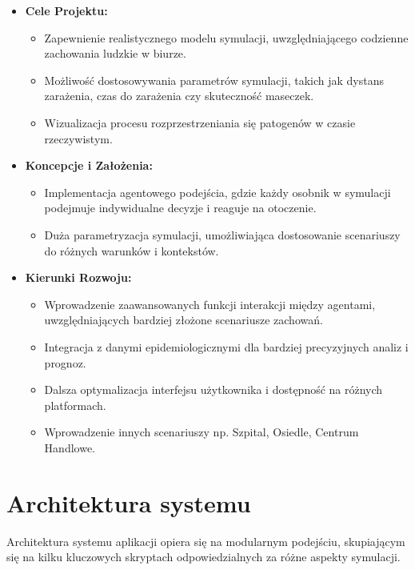 \begin{itemize}
	\item \textbf{Cele Projektu:}
	\begin{itemize}
		\item Zapewnienie realistycznego modelu symulacji, uwzględniającego codzienne zachowania ludzkie w biurze.
		\item Możliwość dostosowywania parametrów symulacji, takich jak dystans zarażenia, czas do zarażenia czy skuteczność maseczek.
		\item Wizualizacja procesu rozprzestrzeniania się patogenów w czasie rzeczywistym.
	\end{itemize}
	\item \textbf{Koncepcje i Założenia:}
	\begin{itemize}
		\item Implementacja agentowego podejścia, gdzie każdy osobnik w symulacji podejmuje indywidualne decyzje i reaguje na otoczenie.
		\item Duża parametryzacja symulacji, umożliwiająca dostosowanie scenariuszy do różnych warunków i kontekstów.
	\end{itemize}
	\item \textbf{Kierunki Rozwoju:}
	\begin{itemize}
		\item Wprowadzenie zaawansowanych funkcji interakcji między agentami, uwzględniających bardziej złożone scenariusze zachowań.
		\item Integracja z danymi epidemiologicznymi dla bardziej precyzyjnych analiz i prognoz.
		\item Dalsza optymalizacja interfejsu użytkownika i dostępność na różnych platformach.
		\item Wprowadzenie innych scenariuszy np. Szpital, Osiedle, Centrum Handlowe.
	\end{itemize}
\end{itemize}

\section{\textbf{Architektura systemu}}

Architektura systemu aplikacji opiera się na modularnym podejściu, skupiającym się na kilku kluczowych skryptach odpowiedzialnych za różne aspekty symulacji.

